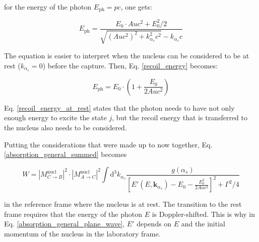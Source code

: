 \documentclass{article}
\begin{document}
for the energy of the photon $E_\mathrm{ph} = pc$, one gets:

\begin{equation}
	\label{recoil_energy}
	E_\mathrm{ph} = \frac{E_0 \cdot Auc^2 + E_0^2/2}{\sqrt{\left( Auc^2\right)^2 + k_{\alpha_s}^2 c^2} - k_{\alpha_s}c}
\end{equation}

The equation is easier to interpret when the nucleus can be considered to be at rest ($k_{\alpha_s} = 0$) before the capture. 
Then, Eq. \ref{recoil_energy} becomes:

\begin{equation}
	\label{recoil_energy_at_rest}
	E_\mathrm{ph} = E_0 \cdot \left( 1 + \frac{E_0}{2 Auc^2} \right)
\end{equation}

Eq. \ref{recoil_energy_at_rest} states that the photon needs to have not only enough energy to excite the state $j$, but the recoil energy that is transferred to the nucleus also needs to be considered.

Putting the considerations that were made up to now together, Eq. \ref{absorption_general_summed} becomes

\begin{equation}
\label{absorption_general_plane_wave}
	W = \left| M^{\mathrm{nucl}}_{C \to B} \right|^2 \cdot \left| M^{\mathrm{nucl}}_{A \to C} \right|^2 \int \mathrm{d}^3 k_{\alpha_s}  \frac{g(\alpha_s)}{ \left[ E' (E, \mathbf{k}_{\alpha_s})- E_0 - \frac{E_0^2}{2 Auc^2} \right]^2 + \Gamma^2 / 4}
\end{equation}

in the reference frame where the nucleus is at rest. 
The transition to the rest frame requires that the energy of the photon $E$ is Doppler-shifted.
This is why in Eq. \ref{absorption_general_plane_wave}, $E'$ depends on $E$ and the initial momentum of the nucleus in the laboratory frame.

%
\end{document}
